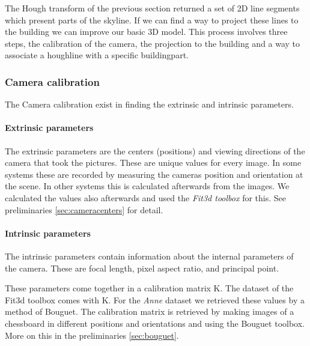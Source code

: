 	The Hough transform of the previous section returned a set of 2D line
	segments which present parts of the skyline.  If we can find a way to
	project these lines to the building we can improve our basic 3D model.
	This process involves three steps, the calibration of the camera, the
	projection to the building and a way to associate a houghline with a
	specific buildingpart.

	\subsubsection{Camera calibration}
	The Camera calibration exist in finding the extrinsic and intrinsic parameters.

	\paragraph{Extrinsic parameters}
	The extrinsic parameters are the centers (positions) and viewing
	directions of the camera that took the pictures. 
	These are unique values for
	every image.
	In some systems these are recorded by measuring the cameras position and
	orientation at the scene. In other systems this is calculated 
	afterwards from the images.  We calculated the values also afterwards and used the
	\emph{Fit3d toolbox} \cite{Fit3d} for this.
	See preliminaries \ref{sec:cameracenters} for detail.\\  

	\paragraph{Intrinsic parameters}
	The intrinsic parameters contain information about the internal parameters
	of the camera.  These are focal length, pixel aspect ratio, and principal point.


	These parameters come together in a calibration matrix K.  The dataset of
	the Fit3d toolbox \cite{Fit3d} comes with K.  For the \emph{Anne} dataset we
	retrieved these values by a method of Bouguet.
	The calibration matrix is retrieved by making images of a chessboard in
	different positions and orientations and using the Bouguet toolbox.
	More on this in the preliminaries \ref{sec:bouguet}.
	 
